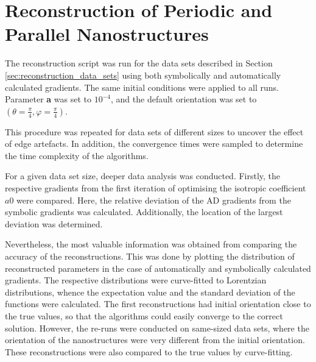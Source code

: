 

\section{Reconstruction of Periodic and Parallel Nanostructures}\label{sec:pp_nanostructures_reconstruction}


The reconstruction script was run for the data sets described in Section \ref{sec:reconstruction_data_sets} using both symbolically and automatically calculated gradients.
The same initial conditions were applied to all runs.
Parameter \textbf{a} was set to $10^{-4}$, and the default orientation was set to $\left( \theta = \frac{\pi}{4}, \varphi = \frac{\pi}{4} \right)$.

This procedure was repeated for data sets of different sizes to uncover the effect of edge artefacts.
In addition, the convergence times were sampled to determine the time complexity of the algorithms.

For a given data set size, deeper data analysis was conducted.
Firstly, the respective gradients from the first iteration of optimising the isotropic coefficient $a0$ were compared.
Here, the relative deviation of the AD gradients from the symbolic gradients was calculated.
Additionally, the location of the largest deviation was determined.

Nevertheless, the most valuable information was obtained from comparing the accuracy of the reconstructions.
This was done by plotting the distribution of reconstructed parameters in the case of automatically and symbolically calculated gradients.
The respective distributions were curve-fitted to Lorentzian distributions, whence the expectation value and the standard deviation of the functions were calculated.
The first reconstructions had initial orientation close to the true values, so that the algorithms could easily converge to the correct solution.
However, the re-runs were conducted on same-sized data sets, where the orientation of the nanostructures were very different from the initial orientation.
These reconstructions were also compared to the true values by curve-fitting.

